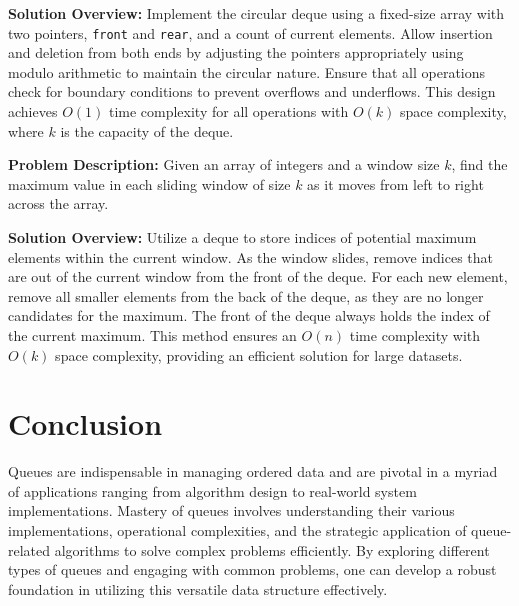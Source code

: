 \textbf{Solution Overview:}  
Implement the circular deque using a fixed-size array with two pointers, \texttt{front} and \texttt{rear}, and a count of current elements. Allow insertion and deletion from both ends by adjusting the pointers appropriately using modulo arithmetic to maintain the circular nature. Ensure that all operations check for boundary conditions to prevent overflows and underflows. This design achieves \(O(1)\) time complexity for all operations with \(O(k)\) space complexity, where \(k\) is the capacity of the deque.


\textbf{Problem Description:}  
Given an array of integers and a window size \(k\), find the maximum value in each sliding window of size \(k\) as it moves from left to right across the array.

\textbf{Solution Overview:}  
Utilize a deque to store indices of potential maximum elements within the current window. As the window slides, remove indices that are out of the current window from the front of the deque. For each new element, remove all smaller elements from the back of the deque, as they are no longer candidates for the maximum. The front of the deque always holds the index of the current maximum. This method ensures an \(O(n)\) time complexity with \(O(k)\) space complexity, providing an efficient solution for large datasets.

\section{Conclusion}

Queues are indispensable in managing ordered data and are pivotal in a myriad of applications ranging from algorithm design to real-world system implementations. Mastery of queues involves understanding their various implementations, operational complexities, and the strategic application of queue-related algorithms to solve complex problems efficiently. By exploring different types of queues and engaging with common problems, one can develop a robust foundation in utilizing this versatile data structure effectively.